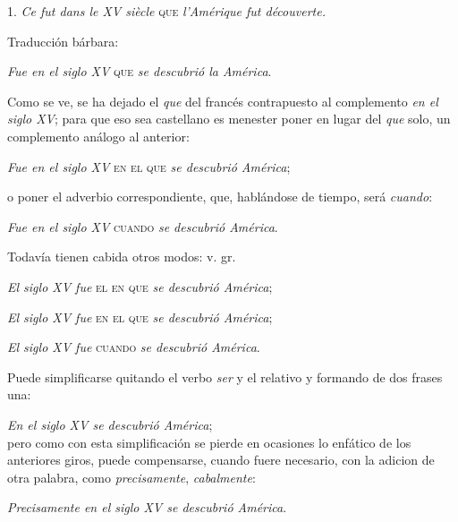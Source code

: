 \documentclass{book}
\begin{document}
1. \emph{Ce fut dans le XV siècle} \textsc{que} \emph{l'Amérique fut découverte.}

Traducci\'on bárbara:

\emph{Fue en el siglo XV} \textsc{que} \emph{se descubrió la América}.

Como se ve, se ha dejado el \emph{que} del francés contrapuesto al complemento \emph{en el siglo XV}; para que eso sea castellano es menester poner en lugar del \emph{que} solo, un complemento análogo al 
anterior:

\emph{Fue en el siglo XV} \textsc{en el que} \emph{se descubrió América};

o poner el adverbio correspondiente, que, hablándose de tiempo, será \emph{cuando}:

\emph{Fue en el siglo XV} \textsc{cuando} \emph{se descubrió América}.

Todavía tienen cabida otros modos: v. gr.

\emph{El siglo XV  fue} \textsc{el en que} \emph{se descubrió América};

\emph{El siglo XV  fue} \textsc{en el que} \emph{se descubrió América};

\emph{El siglo XV  fue} \textsc{cuando} \emph{se descubrió América}.

Puede simplificarse quitando el verbo \emph{ser} y el relativo y formando de dos frases una:

\emph{En el siglo XV se descubrió América};
\\
pero como con esta simplificación se pierde en ocasiones lo enfático de los anteriores giros, puede compensarse, cuando fuere necesario, con la adicion de otra palabra, como \emph{precisamente}, 
\emph{cabalmente}:

\emph{Precisamente en el siglo XV se descubrió América}.
\end{document}
